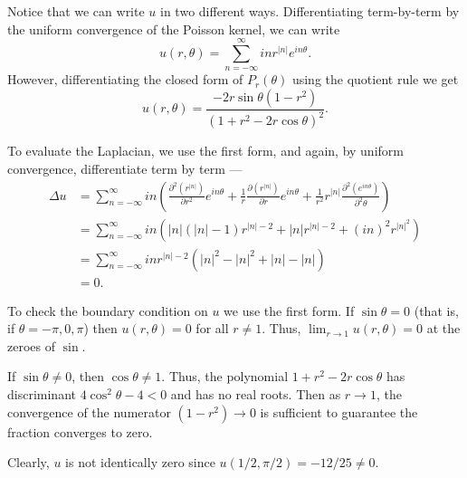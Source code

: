 \documentclass[12 pt, letterpaper]{hmcpset}
\begin{document}
\begin{solution}
	Notice that we can write $u$ in two different ways. Differentiating term-by-term by the uniform convergence of the Poisson kernel, we can write
	\[
		u(r, \theta) = \sum_{n = -\infty}^{\infty} in r^{\lvert n \rvert} e^{i n \theta}.
	\]
	However, differentiating the closed form of $P_{r}(\theta)$ using the quotient rule we get
	\[
		u(r, \theta) = \frac{-2r \sin{\theta} (1 - r^{2})}{(1 + r^{2} - 2 r \cos{\theta})^{2}}.
	\]

	To evaluate the Laplacian, we use the first form, and again, by uniform convergence, differentiate term by term ---
	\begin{align*}
		\Delta u & = \sum_{n = -\infty}^{\infty} in \left ( \frac{\partial^{2} (r^{\lvert n \rvert})}{\partial r^{2}} e^{i n \theta} + \frac{1}{r} \frac{\partial (r^{\lvert n \rvert})}{\partial r} e^{i n \theta} + \frac{1}{r^{2}} r^{\lvert n \rvert} \frac{\partial^{2} (e^{i n \theta})}{\partial^{2} \theta} \right ) \\
			 & = \sum_{n = -\infty}^{\infty} in \left ( \lvert n \rvert (\lvert n \rvert - 1) r^{\lvert n \rvert - 2} + \lvert n \rvert r^{\lvert n \rvert - 2} + (in)^{2} r^{\lvert n \rvert^{2}} \right ) \\
			 & = \sum_{n = -\infty}^{\infty} i n r^{\lvert n \rvert - 2}(\lvert n \rvert^{2} - \lvert n \rvert^{2} + \lvert n \rvert - \lvert n \rvert) \\
			 & = 0.
	\end{align*}

	To check the boundary condition on $u$ we use the first form. If $\sin{\theta} = 0$ (that is, if $\theta = -\pi, 0, \pi$) then $u(r, \theta) = 0$ for all $r \neq 1$. Thus, $\lim_{r \to 1} u(r, \theta) = 0$ at the zeroes of $\sin{}$.

	If $\sin{\theta} \neq 0$, then $\cos{\theta} \neq 1$. Thus, the polynomial $1 + r^{2} - 2 r \cos{\theta}$ has discriminant $4 \cos^{2}{\theta} - 4 < 0$ and has no real roots. Then as $r \to 1$, the convergence of the numerator $(1 - r^{2}) \to 0$ is sufficient to guarantee the fraction converges to zero.

	Clearly, $u$ is not identically zero since $u(1/2, \pi / 2) = -12/25 \neq 0$.
\end{solution}

\pagebreak
\end{document}
